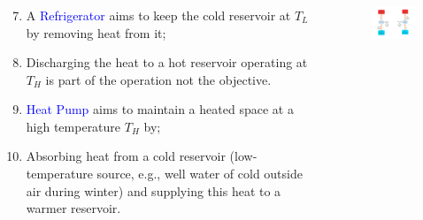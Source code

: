 \documentclass[10pt,compress,handout,ignorenonframetext]{beamer}
\begin{document}
\begin{frame}
 \frametitle{}
  \begin{columns}
   \begin{column}[c]{0.45\linewidth}
    \begin{enumerate}\setcounter{enumi}{6}
     \item <1-> A \textcolor{blue}{Refrigerator} aims to keep the cold reservoir at $T_{L}$ by removing heat from it;
     \item <2-> Discharging the heat to a hot reservoir operating at $T_{H}$ is part of the operation not the objective.
     \item <3-> \textcolor{blue}{Heat Pump} aims to maintain a heated space at a high temperature $T_{H}$ by;
     \item <4-> Absorbing heat from a cold reservoir (low-temperature source, e.g., well water of cold outside air during winter) and supplying this heat to a warmer reservoir.
    \end{enumerate}
   \end{column}
   \begin{column}[c]{0.55\linewidth}
    \begin{figure}%
     \begin{center}
      \includegraphics[width=7.5cm,clip]{./Pics/Overview_Refrig2}
     \end{center}
    \end{figure}  
   \end{column}  
  \end{columns}
\end{frame}
\end{document}
